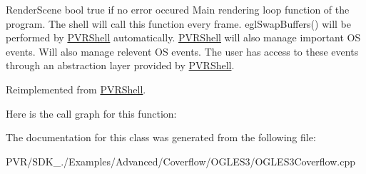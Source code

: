   Render\+Scene  bool true if no error occured  Main rendering loop function of the program. The shell will call this function every frame. egl\+Swap\+Buffers() will be performed by \hyperlink{class_p_v_r_shell}{P\+V\+R\+Shell} automatically. \hyperlink{class_p_v_r_shell}{P\+V\+R\+Shell} will also manage important O\+S events. Will also manage relevent O\+S events. The user has access to these events through an abstraction layer provided by \hyperlink{class_p_v_r_shell}{P\+V\+R\+Shell}. 

Reimplemented from \hyperlink{class_p_v_r_shell_ae0eb5f797cbe993a22b8659f9c332578}{P\+V\+R\+Shell}.



Here is the call graph for this function\+:




The documentation for this class was generated from the following file\+:\begin{DoxyCompactItemize}
\item 
P\+V\+R/\+S\+D\+K\+\_./\+Examples/\+Advanced/\+Coverflow/\+O\+G\+L\+E\+S3/O\+G\+L\+E\+S3\+Coverflow.\+cpp\end{DoxyCompactItemize}
